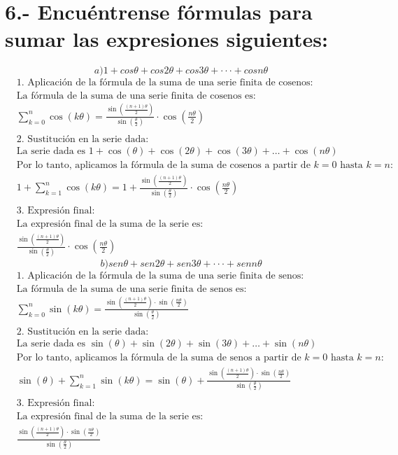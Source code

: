 \documentclass{article}
\begin{document}
\section*{6.- Encuéntrense fórmulas para sumar las expresiones siguientes: }
\[
a) 1 + cos θ + cos 2θ + cos 3θ + · · · + cos nθ
\]
\begin{align*}
&\text{1. Aplicación de la fórmula de la suma de una serie finita de cosenos:} \\
&\text{La fórmula de la suma de una serie finita de cosenos es:} \\
&\sum_{k=0}^{n} \cos(k\theta) = \frac{\sin\left(\frac{(n+1)\theta}{2}\right)}{\sin\left(\frac{\theta}{2}\right)} \cdot \cos\left(\frac{n\theta}{2}\right) \\
& \\
&\text{2. Sustitución en la serie dada:} \\
&\text{La serie dada es } 1 + \cos(\theta) + \cos(2\theta) + \cos(3\theta) + \ldots + \cos(n\theta) \\
&\text{Por lo tanto, aplicamos la fórmula de la suma de cosenos a partir de } k = 0 \text{ hasta } k = n: \\
& 1 + \sum_{k=1}^{n} \cos(k\theta) = 1 + \frac{\sin\left(\frac{(n+1)\theta}{2}\right)}{\sin\left(\frac{\theta}{2}\right)} \cdot \cos\left(\frac{n\theta}{2}\right) \\
& \\
&\text{3. Expresión final:} \\
&\text{La expresión final de la suma de la serie es:} \\
&  \frac{\sin\left(\frac{(n+1)\theta}{2}\right)}{\sin\left(\frac{\theta}{2}\right)} \cdot \cos\left(\frac{n\theta}{2}\right)
\end{align*}
\newpage
\[
b) sen θ + sen 2θ + sen 3θ + · · · + sen nθ
\]
\begin{align*}
&\text{1. Aplicación de la fórmula de la suma de una serie finita de senos:} \\
&\text{La fórmula de la suma de una serie finita de senos es:} \\
&\sum_{k=0}^{n} \sin(k\theta) = \frac{\sin\left(\frac{(n+1)\theta}{2}\right) \cdot \sin\left(\frac{n\theta}{2}\right)}{\sin\left(\frac{\theta}{2}\right)} \\
& \\
&\text{2. Sustitución en la serie dada:} \\
&\text{La serie dada es } \sin(\theta) + \sin(2\theta) + \sin(3\theta) + \ldots + \sin(n\theta) \\
&\text{Por lo tanto, aplicamos la fórmula de la suma de senos a partir de } k = 0 \text{ hasta } k = n: \\
& \sin(\theta) + \sum_{k=1}^{n} \sin(k\theta) = \sin(\theta) + \frac{\sin\left(\frac{(n+1)\theta}{2}\right) \cdot \sin\left(\frac{n\theta}{2}\right)}{\sin\left(\frac{\theta}{2}\right)} \\
& \\
&\text{3. Expresión final:} \\
&\text{La expresión final de la suma de la serie es:} \\
&  \frac{\sin\left(\frac{(n+1)\theta}{2}\right) \cdot \sin\left(\frac{n\theta}{2}\right)}{\sin\left(\frac{\theta}{2}\right)}
\end{align*}
\end{document}
